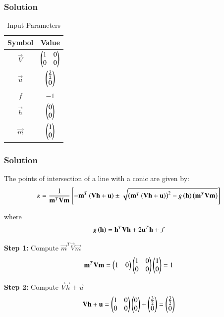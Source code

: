 \documentclass{beamer}
\numberwithin{equation}{section}
\begin{document}
\begin{frame}[fragile]
    \frametitle{Solution}

\begin{table}[H]
\centering
\begin{tabular}{|c|c|}
\hline
\textbf{Symbol} & \textbf{Value} \\
\hline
$\vec{V}$ & $\begin{pmatrix}1 & 0 \\ 0 & 0\end{pmatrix}$ \\
\hline
$\vec{u}$ & $\begin{pmatrix}\frac{3}{2} \\ 0\end{pmatrix}$ \\
\hline
$f$ & $-1$ \\
\hline
$\vec{h}$ & $\begin{pmatrix}0 \\ 0\end{pmatrix}$ \\
\hline
$\vec{m}$ & $\begin{pmatrix}1 \\ 0\end{pmatrix}$ \\
\hline
\end{tabular}
\caption{Input Parameters}
\label{tab:input}
\end{table}

\end{frame}

\begin{frame}[fragile]
    \frametitle{Solution}
The points of intersection of a line with a conic are given by:
\begin{align}
\kappa = \frac{1}{\mathbf{m}^T\mathbf{V}\mathbf{m}} {}\left[-\mathbf{m}^T\left(\mathbf{V}\mathbf{h} + \mathbf{u}\right) \pm \sqrt{\left(\mathbf{m}^T\left(\mathbf{V}\mathbf{h} + \mathbf{u}\right)\right)^2 - g\left(\mathbf{h}\right)\left(\mathbf{m}^T\mathbf{V}\mathbf{m}\right)}\right]
\end{align}

where
\begin{align}
g\left(\mathbf{h}\right) = \mathbf{h}^T\mathbf{V}\mathbf{h} + 2\mathbf{u}^T\mathbf{h} + f
\end{align}

\textbf{Step 1:} Compute $\vec{m}^T\vec{V}\vec{m}$
\begin{align}
\mathbf{m}^T\mathbf{V}\mathbf{m} = \begin{pmatrix}1 & 0\end{pmatrix}\begin{pmatrix}1 & 0 \\ 0 & 0\end{pmatrix}\begin{pmatrix}1 \\ 0\end{pmatrix} = 1
\end{align}

\textbf{Step 2:} Compute $\vec{V}\vec{h} + \vec{u}$
\begin{align}
\mathbf{V}\mathbf{h} + \mathbf{u} = \begin{pmatrix}1 & 0 \\ 0 & 0\end{pmatrix}\begin{pmatrix}0 \\ 0\end{pmatrix} + \begin{pmatrix}\frac{3}{2} \\ 0\end{pmatrix} = \begin{pmatrix}\frac{3}{2} \\ 0\end{pmatrix}
\end{align}

\end{frame}
\end{document}
